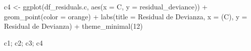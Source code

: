 \documentclass[
  letterpaper,
  DIV=11,
  numbers=noendperiod]{scrartcl}
\newenvironment{Shaded}{\begin{snugshade}}{\end{snugshade}}
\newcommand{\AttributeTok}[1]{\textcolor[rgb]{0.40,0.45,0.13}{#1}}
\newcommand{\DecValTok}[1]{\textcolor[rgb]{0.68,0.00,0.00}{#1}}
\newcommand{\FunctionTok}[1]{\textcolor[rgb]{0.28,0.35,0.67}{#1}}
\newcommand{\NormalTok}[1]{\textcolor[rgb]{0.00,0.23,0.31}{#1}}
\newcommand{\OtherTok}[1]{\textcolor[rgb]{0.00,0.23,0.31}{#1}}
\newcommand{\SpecialCharTok}[1]{\textcolor[rgb]{0.37,0.37,0.37}{#1}}
\newcommand{\StringTok}[1]{\textcolor[rgb]{0.13,0.47,0.30}{#1}}
\begin{document}
\begin{Shaded}
\begin{Highlighting}[]
\NormalTok{c4 }\OtherTok{\textless{}{-}} \FunctionTok{ggplot}\NormalTok{(df\_residuals.c, }\FunctionTok{aes}\NormalTok{(}\AttributeTok{x =}\NormalTok{ C, }\AttributeTok{y =}\NormalTok{ residual\_deviance)) }\SpecialCharTok{+}
    \FunctionTok{geom\_point}\NormalTok{(}\AttributeTok{color =} \StringTok{\textquotesingle{}orange\textquotesingle{}}\NormalTok{) }\SpecialCharTok{+}
    \FunctionTok{labs}\NormalTok{(}\AttributeTok{title =} \StringTok{\textquotesingle{}Residual de Devianza\textquotesingle{}}\NormalTok{, }\AttributeTok{x =} \StringTok{\textquotesingle{}(C)\textquotesingle{}}\NormalTok{, }\AttributeTok{y =} \StringTok{\textquotesingle{}Residual de Devianza\textquotesingle{}}\NormalTok{) }\SpecialCharTok{+}
    \FunctionTok{theme\_minimal}\NormalTok{(}\DecValTok{12}\NormalTok{)}
\end{Highlighting}
\end{Shaded}

\begin{Shaded}
\begin{Highlighting}[]
\NormalTok{c1; c2; c3; c4}
\end{Highlighting}
\end{Shaded}
\end{document}
